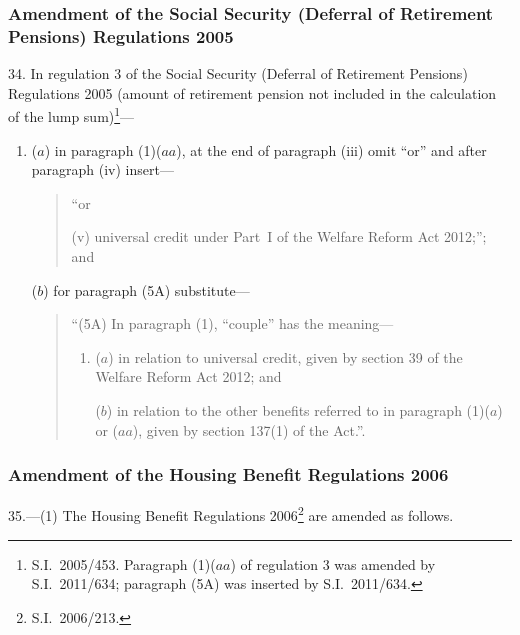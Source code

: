 \documentclass[12pt,a4paper]{article}
\begin{document}
\subsubsection[34. Amendment of the Social Security (Deferral of Retirement Pensions) Regulations 2005]{Amendment of the Social Security (Deferral of Retirement Pensions) Regulations 2005}

34.  In regulation 3 of the Social Security (Deferral of Retirement Pensions) Regulations 2005 (amount of retirement pension not included in the calculation of the lump sum)\footnote{S.I.~2005/453. Paragraph (1)($aa$) of regulation 3 was amended by S.I.~2011/634; paragraph (5A) was inserted by S.I.~2011/634.}—
\begin{enumerate}\item[]
($a$) in paragraph (1)($aa$), at the end of paragraph (iii)  omit “or” and after paragraph (iv)  insert—
\begin{quotation}
“or

(v) universal credit under Part~I of the Welfare Reform Act 2012;”; and
\end{quotation}

($b$) for paragraph (5A) substitute—
\begin{quotation}
“(5A) In paragraph (1), ``couple'' has the meaning—
\begin{enumerate}\item[]
($a$) in relation to universal credit, given by section 39 of the Welfare Reform Act 2012; and

($b$) in relation to the other benefits referred to in paragraph (1)($a$)  or ($aa$), given by section 137(1) of the Act.”.
\end{enumerate}
\end{quotation}
\end{enumerate}

\subsubsection[35. Amendment of the Housing Benefit Regulations 2006]{Amendment of the Housing Benefit Regulations 2006}

35.—(1) The Housing Benefit Regulations 2006\footnote{S.I.~2006/213.} are amended as follows.
\end{document}
